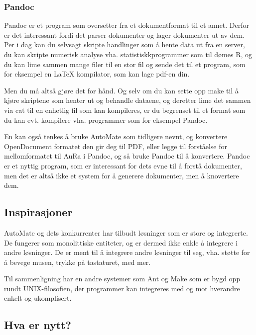 \documentclass[11pt]{article}
\begin{document}
\subsubsection{Pandoc}



Pandoc er et program som oversetter fra et dokumentformat til et annet. Derfor er det interessant fordi det parser dokumenter og lager dokumenter ut av dem.
Per i dag kan du selvsagt skripte handlinger som å hente data ut fra en server, du kan skripte numerisk analyse vha. statistiskkprogrammer som til dømes R, og du kan lime sammen mange filer til en stor fil og sende det til et program, som for eksempel en LaTeX kompilator, som kan lage pdf-en din.



Men du må altså gjøre det for hånd. Og selv om du kan sette opp make til å kjøre skriptene som henter ut og behandle dataene, og deretter lime det sammen via cat til en enhetlig fil som kan kompileres, er du begrenset til et format som du kan evt. kompilere vha. programmer som for eksempel Pandoc.



En kan også tenkes å bruke AutoMate som tidligere nevnt, og konvertere OpenDocument formatet den gir deg til PDF, eller legge til forståelse for mellomformatet til AuRa i Pandoc, og så bruke Pandoc til å konvertere. Pandoc er et nyttig program, som er interessant for dets evne til å forstå dokumenter, men det er altså ikke et system for å generere dokumenter, men å knovertere dem.



\subsection{Inspirasjoner}



AutoMate og dets konkurrenter har tilbudt løsninger som er store og integrerte. De fungerer som monolittiske entiteter, og er dermed ikke enkle å integrere i andre løsninger. De er ment til å integrere andre løsninger til seg, vha. støtte for å bevege musen, trykke på tastaturet, med mer.



Til sammenligning har en andre systemer som Ant og Make som er bygd opp rundt UNIX-filosofien\cite{taop}, der programmer kan integreres med og mot hverandre enkelt og ukomplisert.



\subsection{Hva er nytt?}
\end{document}
